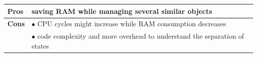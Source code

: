 \newpage
{}
\begin{table}[h!t]
    \begin{tabularx}{\textwidth}{|l|X|}
        \hline
        \textbf{Pros} & saving RAM while managing several similar 
                        objects \\
        \hline
        \textbf{Cons} & $\bullet$ CPU cycles might increase while 
                        RAM consumption decreases \\
                      & $\bullet$ code complexity and more overhead 
                        to understand the separation of states \\
        \hline      
    \end{tabularx}
\end{table}

    
\newpage
